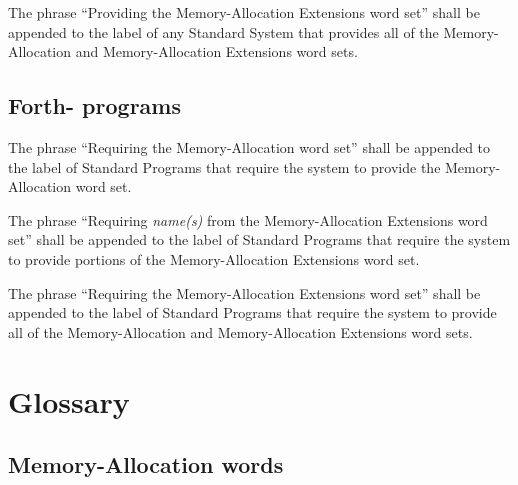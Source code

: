 The phrase ``Providing the Memory-Allocation Extensions word set''
shall be appended to the label of any Standard System that provides
all of the Memory-Allocation and Memory-Allocation Extensions word
sets.

\subsection{Forth-\snapshot{} programs} %

The phrase ``Requiring the Memory-Allocation word set'' shall be
appended to the label of Standard Programs that require the system
to provide the Memory-Allocation word set.

The phrase ``Requiring \emph{name(s)} from the Memory-Allocation
Extensions word set'' shall be appended to the label of Standard
Programs that require the system to provide portions of the
Memory-Allocation Extensions word set.

The phrase ``Requiring the Memory-Allocation Extensions word set''
shall be appended to the label of Standard Programs that require
the system to provide all of the Memory-Allocation and
Memory-Al\-lo\-ca\-tion Extensions word sets.

\enlargethispage{10ex}
\vspace*{-1ex}
\section{Glossary} %

\subsection{Memory-Allocation words} %

